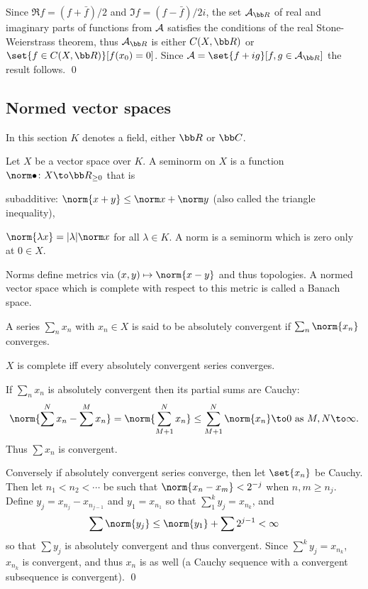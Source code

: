 \bproof

    Since $\Re f=(f+\bar f)/2$ and $\Im f=(f-\bar f)/2i$, the set $\A_\bR$ of real and imaginary parts of functions from ${{\cal A}}$ satisfies the conditions
    of the real Stone-Weierstrass theorem, thus $\A_\bR$ is either $C(X,\bR)$ or $\set{f\in C(X,\bR)}[f(x_0)=0]$.
    Since $\A=\set{f+ig}[f,g\in\A_\bR]$ the result follows.
    \qed

\eproof

\subsection{Normed vector spaces}

In this section $K$ denotes a field, either $\bR$ or $\bC$.

\bdefn

    Let $X$ be a vector space over $K$.
    A {\emphcolor seminorm} on $X$ is a function $\norm\bul\colon X\to\bR_{\geq0}$ that is
    \benum
        \item {\emphcolor subadditive}: $\norm{x+y}\leq\norm x+\norm y$ (also called the {\emphcolor triangle inequality}),
        \item $\norm{\lambda x}=\abs\lambda\norm x$ for all $\lambda\in K$.
    \eenum
    A {\emphcolor norm} is a seminorm which is zero only at $0\in X$.

\edefn

Norms define metrics via $(x,y)\mapsto\norm{x-y}$ and thus topologies.
A normed vector space which is complete with respect to this metric is called a {\emphcolor Banach space}.

A series $\sum_nx_n$ with $x_n\in X$ is said to be {\emphcolor absolutely convergent} if $\sum_n\norm{x_n}$ converges.

\bthrm

    $X$ is complete iff every absolutely convergent series converges.

\ethrm

\bproof

    If $\sum_nx_n$ is absolutely convergent then its partial sums are Cauchy:
    $$ \norm{\sum^N x_n - \sum^M x_n} = \norm{\sum_{M+1}^Nx_n} \leq \sum_{M+1}^N\norm{x_n} \to 0\hbox{ as $M,N\to\infty$} . $$
    Thus $\sum x_n$ is convergent.

    Conversely if absolutely convergent series converge, then let $\set{x_n}$ be Cauchy.
    Then let $n_1<n_2<\cdots$ be such that $\norm{x_n-x_m}<2^{-j}$ when $n,m\geq n_j$.
    Define $y_j=x_{n_j}-x_{n_{j-1}}$ and $y_1=x_{n_1}$ so that $\sum_1^ky_j=x_{n_k}$, and
    $$ \sum\norm{y_j} \leq \norm{y_1} + \sum 2^{j-1} < \infty $$
    so that $\sum y_j$ is absolutely convergent and thus convergent.
    Since $\sum^ky_j=x_{n_k}$, $x_{n_k}$ is convergent, and thus $x_n$ is as well (a Cauchy sequence with a convergent subsequence is convergent).
    \qed

